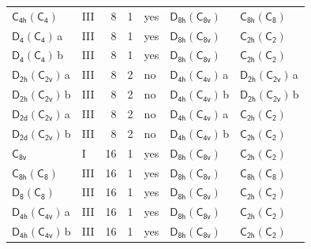 \documentclass[10pt,a4paper]{article}
\numberwithin{equation}{section}
\newcommand{\grp}[1]{\mathsf{#1}}
\newcommand{\clsletter}[1]{\,{\scriptsize\color{black!55}#1}}
\begin{document}
{\begin{longtable}{@{}llrrlll@{}}
\href{C4h-C4.pdf}{$\grp{C_{4h}}(\grp{C_{4}})$} & III & 8 & 1 & yes & \href{D8h-C8v.pdf}{$\grp{D_{8h}}(\grp{C_{8v}})$} & \href{C8h-C8.pdf}{$\grp{C_{8h}}(\grp{C_{8}})$}\\
\href{D4-C4.pdf}{$\grp{D_{4}}(\grp{C_{4}})$}\clsletter{a} & III & 8 & 1 & yes & \href{D8h-C8v.pdf}{$\grp{D_{8h}}(\grp{C_{8v}})$} & \href{C2h-C2.pdf}{$\grp{C_{2h}}(\grp{C_{2}})$}\\
\href{D4-C4.pdf}{$\grp{D_{4}}(\grp{C_{4}})$}\clsletter{b} & III & 8 & 1 & yes & \href{D8h-C8v.pdf}{$\grp{D_{8h}}(\grp{C_{8v}})$} & \href{C2h-C2.pdf}{$\grp{C_{2h}}(\grp{C_{2}})$}\\
\href{D2h-C2v.pdf}{$\grp{D_{2h}}(\grp{C_{2v}})$}\clsletter{a} & III & 8 & 2 & no & \href{D4h-C4v.pdf}{$\grp{D_{4h}}(\grp{C_{4v}})$}\clsletter{a} & \href{D2h-C2v.pdf}{$\grp{D_{2h}}(\grp{C_{2v}})$}\clsletter{a}\\
\href{D2h-C2v.pdf}{$\grp{D_{2h}}(\grp{C_{2v}})$}\clsletter{b} & III & 8 & 2 & no & \href{D4h-C4v.pdf}{$\grp{D_{4h}}(\grp{C_{4v}})$}\clsletter{b} & \href{D2h-C2v.pdf}{$\grp{D_{2h}}(\grp{C_{2v}})$}\clsletter{b}\\
\href{D2d-C2v.pdf}{$\grp{D_{2d}}(\grp{C_{2v}})$}\clsletter{a} & III & 8 & 2 & no & \href{D4h-C4v.pdf}{$\grp{D_{4h}}(\grp{C_{4v}})$}\clsletter{a} & \href{C2h-C2.pdf}{$\grp{C_{2h}}(\grp{C_{2}})$}\\
\href{D2d-C2v.pdf}{$\grp{D_{2d}}(\grp{C_{2v}})$}\clsletter{b} & III & 8 & 2 & no & \href{D4h-C4v.pdf}{$\grp{D_{4h}}(\grp{C_{4v}})$}\clsletter{b} & \href{C2h-C2.pdf}{$\grp{C_{2h}}(\grp{C_{2}})$}\\
\href{../../../rotation/data/pdf/C8v.pdf}{$\grp{C_{8v}}$} & I & 16 & 1 & yes & \href{D8h-C8v.pdf}{$\grp{D_{8h}}(\grp{C_{8v}})$} & \href{C2h-C2.pdf}{$\grp{C_{2h}}(\grp{C_{2}})$}\\
\href{C8h-C8.pdf}{$\grp{C_{8h}}(\grp{C_{8}})$} & III & 16 & 1 & yes & \href{D8h-C8v.pdf}{$\grp{D_{8h}}(\grp{C_{8v}})$} & \href{C8h-C8.pdf}{$\grp{C_{8h}}(\grp{C_{8}})$}\\
\href{D8-C8.pdf}{$\grp{D_{8}}(\grp{C_{8}})$} & III & 16 & 1 & yes & \href{D8h-C8v.pdf}{$\grp{D_{8h}}(\grp{C_{8v}})$} & \href{C2h-C2.pdf}{$\grp{C_{2h}}(\grp{C_{2}})$}\\
\href{D4h-C4v.pdf}{$\grp{D_{4h}}(\grp{C_{4v}})$}\clsletter{a} & III & 16 & 1 & yes & \href{D8h-C8v.pdf}{$\grp{D_{8h}}(\grp{C_{8v}})$} & \href{C2h-C2.pdf}{$\grp{C_{2h}}(\grp{C_{2}})$}\\
\href{D4h-C4v.pdf}{$\grp{D_{4h}}(\grp{C_{4v}})$}\clsletter{b} & III & 16 & 1 & yes & \href{D8h-C8v.pdf}{$\grp{D_{8h}}(\grp{C_{8v}})$} & \href{C2h-C2.pdf}{$\grp{C_{2h}}(\grp{C_{2}})$}\\

\end{longtable}}
\end{document}
